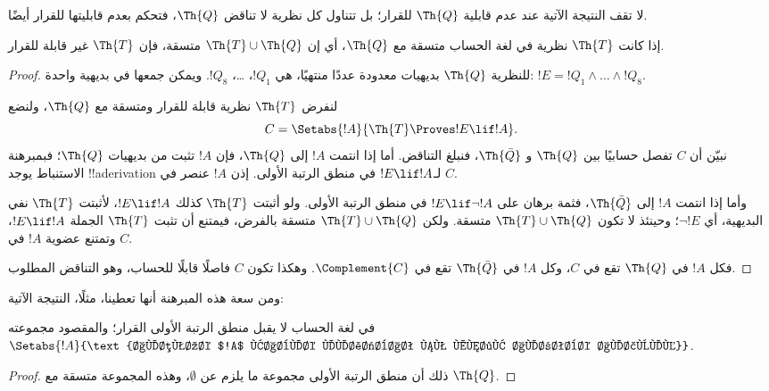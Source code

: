 \documentclass[../../../include/open-logic-section]{subfiles}
\begin{document}


لا تقف النتيجة الآتية عند عدم قابلية $\Th{Q}$ للقرار؛ بل تتناول
كل نظرية لا تناقض $\Th{Q}$، فتحكم بعدم قابليتها للقرار أيضًا.

\begin{thm}
إذا كانت $\Th{T}$ نظرية في لغة الحساب متسقة مع $\Th{Q}$، أي إن
$\Th{T}\cup\Th{Q}$ متسقة، فإن $\Th{T}$ غير قابلة للقرار.
\end{thm}

\begin{proof}
للنظرية $\Th{Q}$ بديهيات معدودة عددًا منتهيًا، هي $!Q_1$، \dots،
$!Q_8$. ويمكن جمعها في بديهية واحدة:
$!E=!Q_1\land\dots\land !Q_8$.

لنفرض $\Th{T}$ نظرية قابلة للقرار ومتسقة مع $\Th{Q}$، ولنضع
\[
C=\Setabs{!A}{\Th{T}\Proves !E\lif !A}.
\]
نبيّن أن $C$ تفصل حسابيًا بين $\Th{Q}$ و
$\Th{\bar Q}$، فنبلغ التناقض. أما إذا انتمت $!A$ إلى $\Th{Q}$،
فإن $!A$ تثبت من بديهيات $\Th{Q}$؛ فبمبرهنة الاستنباط يوجد
!!a{derivation} لـ$!E\lif !A$ في منطق الرتبة الأولى.
إذن $!A$ عنصر في $C$.

وأما إذا انتمت $!A$ إلى $\Th{\bar Q}$، فثمة برهان على
$!E\lif\lnot !A$ في منطق الرتبة الأولى. ولو أثبتت $\Th{T}$
كذلك $!E\lif !A$، لأثبتت $\Th{T}$ نفي البديهية، أي $\lnot !E$؛
وحينئذ لا تكون $\Th{T}\cup\Th{Q}$ متسقة. ولكن
$\Th{T}\cup\Th{Q}$ متسقة بالفرض، فيمتنع أن تثبت $\Th{T}$
الجملة $!E\lif !A$، وتمتنع عضوية $!A$ في $C$.

فكل $!A$ في $\Th{Q}$ تقع في $C$،
وكل $!A$ في $\Th{\bar Q}$ تقع في $\Complement{C}$.
وهكذا تكون $C$ فاصلًا قابلًا للحساب، وهو التناقض المطلوب.
\end{proof}

ومن سعة هذه المبرهنة أنها تعطينا، مثلًا، النتيجة الآتية:

\begin{cor}
  في لغة الحساب لا يقبل منطق الرتبة الأولى القرار؛ والمقصود مجموعته
  $\Setabs{!A}{\text{الصيغة $!A$ قابلة للإثبات في منطق الرتبة الأولى}}$.
\end{cor}

\begin{proof}
ذلك أن منطق الرتبة الأولى مجموعة ما يلزم عن $\emptyset$،
وهذه المجموعة متسقة مع $\Th{Q}$.
\end{proof}
\end{document}
